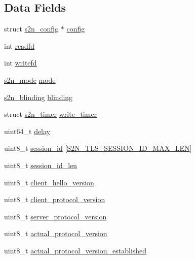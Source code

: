 \subsection*{Data Fields}
\begin{DoxyCompactItemize}
\item 
struct \hyperlink{structs2n__config}{s2n\+\_\+config} $\ast$ \hyperlink{structs2n__connection_a7d70bb7bed95daae1233293126bb9523}{config}
\item 
int \hyperlink{structs2n__connection_ab8b1e66f9a7b17fa4541b1733b87e011}{readfd}
\item 
int \hyperlink{structs2n__connection_abb118879baad1066df4d078fdb2da908}{writefd}
\item 
\hyperlink{s2n_8h_a77a64e3b657f90d221c5faf99c643cdb}{s2n\+\_\+mode} \hyperlink{structs2n__connection_a080df3a36b82d7a11f200fdf1a38f360}{mode}
\item 
\hyperlink{s2n_8h_a364ad496c9dd42fd3117a2f9d3289e62}{s2n\+\_\+blinding} \hyperlink{structs2n__connection_a1bfa8f7b48f1d0d742fed4a18b4d3f40}{blinding}
\item 
struct \hyperlink{structs2n__timer}{s2n\+\_\+timer} \hyperlink{structs2n__connection_a31018fa57bbc729b543d5d33a937748b}{write\+\_\+timer}
\item 
uint64\+\_\+t \hyperlink{structs2n__connection_a8c0b95ab06c950bd9afd8444922d98a3}{delay}
\item 
uint8\+\_\+t \hyperlink{structs2n__connection_ad009472eb0ee35fef5b49e42599a84a1}{session\+\_\+id} \mbox{[}\hyperlink{tls_2s2n__crypto_8h_a29125d7c5bb81700b27164fbc9c92746}{S2\+N\+\_\+\+T\+L\+S\+\_\+\+S\+E\+S\+S\+I\+O\+N\+\_\+\+I\+D\+\_\+\+M\+A\+X\+\_\+\+L\+EN}\mbox{]}
\item 
uint8\+\_\+t \hyperlink{structs2n__connection_a76a9703b780cc6c577acbe9ed651a79d}{session\+\_\+id\+\_\+len}
\item 
uint8\+\_\+t \hyperlink{structs2n__connection_a6055b7733f7282857a29ef763a4aed62}{client\+\_\+hello\+\_\+version}
\item 
uint8\+\_\+t \hyperlink{structs2n__connection_a29289057caf9ad21e99bd972da14acc3}{client\+\_\+protocol\+\_\+version}
\item 
uint8\+\_\+t \hyperlink{structs2n__connection_ae48c8e6d0ef10e7b815dd500562a47e7}{server\+\_\+protocol\+\_\+version}
\item 
uint8\+\_\+t \hyperlink{structs2n__connection_af9b47a1de13de52e7beddb948a40fec1}{actual\+\_\+protocol\+\_\+version}
\item 
uint8\+\_\+t \hyperlink{structs2n__connection_ab54a0b4ad8370fee08f0c47917684e65}{actual\+\_\+protocol\+\_\+version\+\_\+established}

\end{DoxyCompactItemize}
